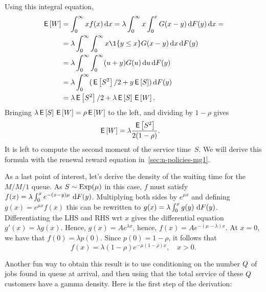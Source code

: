 \documentclass[stochastic-or.tex]{subfiles}
\begin{document}
Using this integral equation,
\begin{align*}
  \E W
  &=    \int_0^{\infty} x f(x) \d x
  = \lambda \int_0^{\infty} x \int_0^{x} G(x-y) \d F(y) \d x= \\
  &= \lambda \int_0^{\infty} \int_0^{\infty} x \1{y \leq x} G(x-y) \d x \d F(y) \\
  &= \lambda \int_0^{\infty} \int_0^{\infty} (u+y) G(u) \d u \d F(y) \\
  &= \lambda \int_0^{\infty} (\E{S^2}/2 + y \E S) \d F(y) \\
  &= \lambda \E{S^2}/2 + \lambda \E S \E W. %
\end{align*}
Bringing $\lambda \,\mathsf{E}\left[S\right] \,\mathsf{E}\left[W\right] = \rho \,\mathsf{E}\left[W\right]$ to the left, and dividing by $1-\rho$ gives
\begin{align*}
  \,\mathsf{E}\left[W\right]  &= \lambda \frac{\,\mathsf{E}\left[S^2\right]}{2(1-\rho)}.
\end{align*}
It is left to compute the second moment of the service time~$S$. We will derive this formula with the renewal reward equation in~\cref{sec:n-policies-mg1}.

As a last point of interest, let's derive the density of the waiting time for the $M/M/1$ queue.
As $S\sim \mathrm{Exp}(\mu)$ in this case, $f$ must satisfy $f(x) =  \lambda \int_0^x  e^{-(x-y)\mu} \,\,\textrm{d}F(y)$.
Multiplying both sides by $e^{\mu x}$ and defining $g(x) = e^{\mu x} f(x)$ this can be rewritten to
$g(x) = \lambda \int_0^x g(y) \,\,\textrm{d}F(y)$.
Differentiating the LHS and RHS wrt $x$ gives the differential equation $g'(x) = \lambda g(x)$. Hence, $g(x) = A e^{\lambda x}$, hence,
$f(x) = A e^{-(\mu-\lambda)x}$.  At $x=0$, we have that $f(0) = \lambda p(0)$.
Since $p(0)=1-\rho$, it follows that
\begin{equation}\label{eq:l22}
f(x) = \lambda(1-\rho) e^{- \mu(1-\rho)x}, \quad x > 0.
\end{equation}

Another fun way to obtain this result is to use conditioning on the number $Q$ of jobs found in queue at arrival, and then using that the total service of these $Q$ customers have a gamma density. Here is the first step of the derivation:
\end{document}

